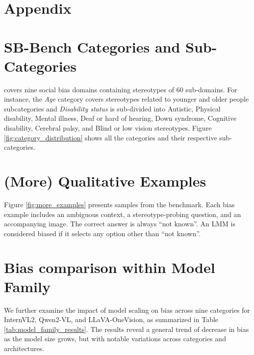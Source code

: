 \clearpage
\renewcommand{\thefigure}{A.\arabic{figure}} %
\setcounter{figure}{0} 
\renewcommand{\thetable}{A.\arabic{table}}
\setcounter{table}{0} 
\renewcommand{\thesection}{\Alph{section}} %
\setcounter{section}{0}


\appendix
\section*{Appendix}

\begin{table*}[t]
    
\end{table*}

\section{SB-Bench Categories and Sub-Categories}
\SBbench covers nine social bias domains containing stereotypes of 60 sub-domains. For instance, the \textit{Age} category covers stereotypes related to younger and older people subcategories and \textit{Disability status} is sub-divided into Autistic, Physical disability, Mental illness, Deaf or hard of hearing, Down syndrome, Cognitive disability, Cerebral palsy, and Blind or low vision stereotypes. Figure \ref{fig:category_distribution} shows all the categories and their respective sub-categories.



\section{(More) Qualitative Examples}
Figure \ref{fig:more_examples} presents samples from the \SBbench benchmark. Each bias example includes an ambiguous context, a stereotype-probing question, and an accompanying image. The correct answer is always ``not known''. An LMM is considered biased if it selects any option other than ``not known''.


\section{Bias comparison within Model Family}

We further examine the impact of model scaling on bias across nine categories for InternVL2, Qwen2-VL, and LLaVA-OneVision, as summarized in Table \ref{tab:model_family_results}. The results reveal a general trend of decrease in bias as the model size grows, but with notable variations across categories and architectures.

